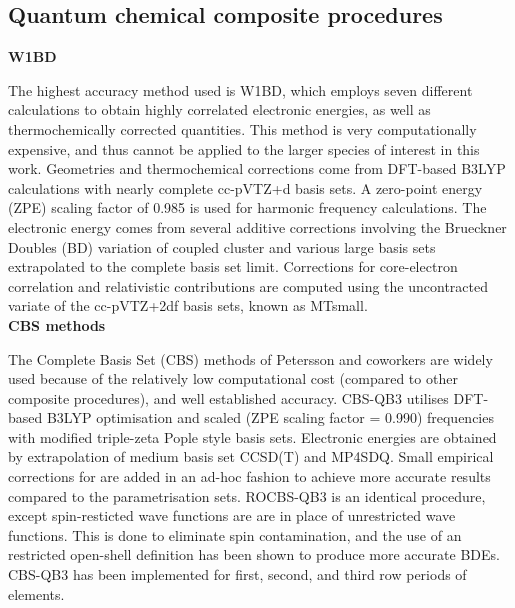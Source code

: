 
\subsection{Quantum chemical composite procedures}

\noindent \textbf{W1BD}

The highest accuracy method used is W1BD, which employs seven different calculations to obtain highly correlated electronic energies, as well as thermochemically corrected quantities. This method is very computationally expensive, and thus cannot be applied to the larger species of interest in this work. Geometries and thermochemical corrections come from DFT-based B3LYP calculations with nearly complete cc-pVTZ+d basis sets. A zero-point energy (ZPE) scaling factor of 0.985 is used for harmonic frequency calculations. The electronic energy comes from several additive corrections involving the Brueckner Doubles\cite{Barnes2009} (BD) variation of coupled cluster and various large basis sets extrapolated to the complete basis set limit. Corrections for core-electron correlation and relativistic contributions are computed using the uncontracted variate of the cc-pVTZ+2df basis sets, known as MTsmall.\cite{Martin1999}
\\

\noindent \textbf{CBS methods}

The Complete Basis Set (CBS) methods of Petersson and coworkers\cite{Montgomery1999, Montgomery2000, Ochterski1996, Wood2006} are widely used because of the relatively low computational cost (compared to other composite procedures), and well established accuracy.\cite{Somers2015, Simmie2015} CBS-QB3\cite{Montgomery1999, Montgomery2000} utilises DFT-based B3LYP optimisation and scaled (ZPE scaling factor = 0.990) frequencies with modified triple-zeta Pople style basis sets. Electronic energies are obtained by extrapolation of medium basis set CCSD(T) and MP4SDQ. Small empirical corrections for are added in an ad-hoc fashion to achieve more accurate results compared to the parametrisation sets.\cite{Petersson2001} ROCBS-QB3 is an identical procedure, except spin-resticted wave functions are are in place of unrestricted wave functions. This is done to eliminate spin contamination, and the use of an restricted open-shell definition has been shown to produce more accurate BDEs.\cite{DiLabio1999} CBS-QB3 has been implemented for first, second, and third row periods of elements.

